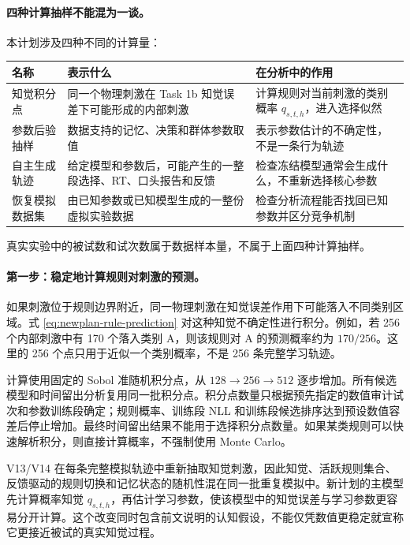 \paragraph{四种计算抽样不能混为一谈。}
本计划涉及四种不同的计算量：
\begin{center}
\small
\begin{tabular}{p{}|p{}|p{}}
\hline
名称 & 表示什么 & 在分析中的作用\\
\hline
知觉积分点
& 同一个物理刺激在 Task 1b 知觉误差下可能形成的内部刺激
& 计算规则对当前刺激的类别概率 $q_{s,t,h}$，进入选择似然\\
\hline
参数后验抽样
& 数据支持的记忆、决策和群体参数取值
& 表示参数估计的不确定性，不是一条行为轨迹\\
\hline
自主生成轨迹
& 给定模型和参数后，可能产生的一整段选择、RT、口头报告和反馈
& 检查冻结模型通常会生成什么，不重新选择核心参数\\
\hline
恢复模拟数据集
& 由已知参数或已知模型生成的一整份虚拟实验数据
& 检查分析流程能否找回已知参数并区分竞争机制\\
\hline
\end{tabular}
\normalsize
\end{center}
真实实验中的被试数和试次数属于数据样本量，不属于上面四种计算抽样。

\paragraph{第一步：稳定地计算规则对刺激的预测。}
如果刺激位于规则边界附近，同一物理刺激在知觉误差作用下可能落入不同类别区域。式 \ref{eq:newplan-rule-prediction} 对这种知觉不确定性进行积分。例如，若 256 个内部刺激中有 170 个落入类别 A，则该规则对 A 的预测概率约为 $170/256$。这里的 256 个点只用于近似一个类别概率，不是 256 条完整学习轨迹。

计算使用固定的 Sobol 准随机积分点，从 $128\rightarrow256\rightarrow512$ 逐步增加。所有候选模型和时间留出分析复用同一批积分点。积分点数量只根据预先指定的数值审计试次和参数训练段确定；规则概率、训练段 NLL 和训练段候选排序达到预设数值容差后停止增加。最终时间留出结果不能用于选择积分点数量。如果某类规则可以快速解析积分，则直接计算概率，不强制使用 Monte Carlo。

V13/V14 在每条完整模拟轨迹中重新抽取知觉刺激，因此知觉、活跃规则集合、反馈驱动的规则切换和记忆状态的随机性混在同一批重复模拟中。新计划的主模型先计算概率知觉 $q_{s,t,h}$，再估计学习参数，使该模型中的知觉误差与学习参数更容易分开计算。这个改变同时包含前文说明的认知假设，不能仅凭数值更稳定就宣称它更接近被试的真实知觉过程。


